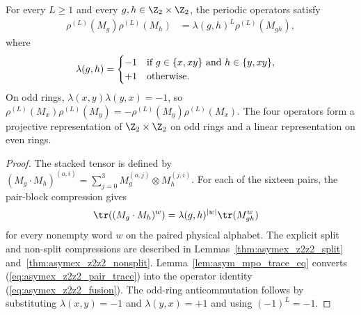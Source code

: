 \begin{lemma}%
    \label{thm:asymex_z2z2_fusion}
    \leanok
    For every $L\geq1$ and every $g,h\in\Z_2\times\Z_2$, the periodic
    operators satisfy
    \begin{align}
        \rho^{(L)}(M_g)\rho^{(L)}(M_h)
         & =\lambda(g,h)^L\rho^{(L)}(M_{gh}),
        \label{eq:asymex_z2z2_fusion}
    \end{align}
    where
    \begin{align}
        \lambda(g,h)
         & =\begin{cases}
                -1 & \text{if }g\in\{x,xy\}\text{ and }h\in\{y,xy\}, \\
                +1 & \text{otherwise}.
            \end{cases}
        \notag
    \end{align}
    On odd rings, $\lambda(x,y)\lambda(y,x)=-1$, so
    $\rho^{(L)}(M_x)\rho^{(L)}(M_y)=-\rho^{(L)}(M_y)\rho^{(L)}(M_x)$.
    The four operators form a projective representation of
    $\Z_2\times\Z_2$ on odd rings and a linear representation on even
    rings.
\end{lemma}

\begin{proof}
    \leanok
    The stacked tensor is defined by
    $(M_g\cdot M_h)^{(o,i)}
        =\sum_{j=0}^3M_g^{(o,j)}\otimes M_h^{(j,i)}$.
    For each of the sixteen pairs, the pair-block compression gives
    \begin{align}
        \tr((M_g\cdot M_h)^w)
         & =\lambda(g,h)^{|w|}\tr(M_{gh}^w)
        \label{eq:asymex_z2z2_pair_trace}
    \end{align}
    for every nonempty word $w$ on the paired physical alphabet.
    The explicit split and non-split compressions are described in
    Lemmas~\ref{thm:asymex_z2z2_split}
    and~\ref{thm:asymex_z2z2_nonsplit}.
    Lemma~\ref{lem:asym_mpo_trace_eq} converts
    (\ref{eq:asymex_z2z2_pair_trace}) into the operator identity
    (\ref{eq:asymex_z2z2_fusion}).
    The odd-ring anticommutation follows by substituting
    $\lambda(x,y)=-1$ and $\lambda(y,x)=+1$ and using $(-1)^L=-1$.
\end{proof}

